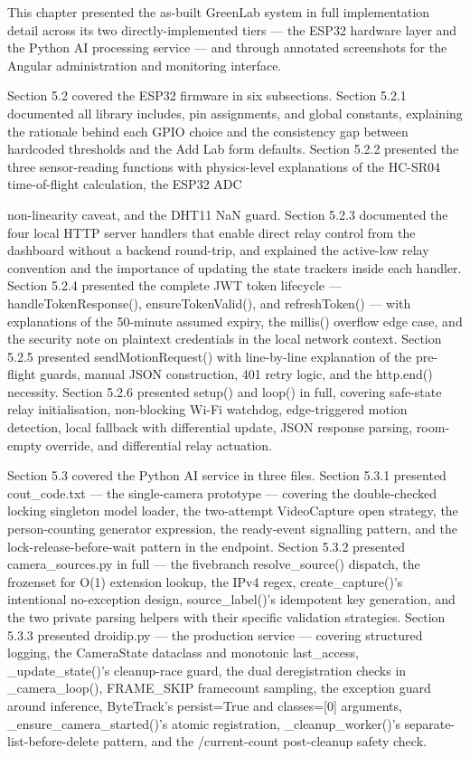 This chapter presented the as-built GreenLab system in full implementation detail across
its two directly-implemented tiers --- the ESP32 hardware layer and the Python AI processing service --- and through annotated screenshots for the Angular administration and
monitoring interface.

Section 5.2 covered the ESP32 ﬁrmware in six subsections. Section 5.2.1 documented
all library includes, pin assignments, and global constants, explaining the rationale behind each GPIO choice and the consistency gap between hardcoded thresholds and the
Add Lab form defaults. Section 5.2.2 presented the three sensor-reading functions with
physics-level explanations of the HC-SR04 time-of-ﬂight calculation, the ESP32 ADC



non-linearity caveat, and the DHT11 NaN guard. Section 5.2.3 documented the four local
HTTP server handlers that enable direct relay control from the dashboard without a backend
round-trip, and explained the active-low relay convention and the importance of updating
the state trackers inside each handler. Section 5.2.4 presented the complete JWT token
lifecycle --- handleTokenResponse(), ensureTokenValid(), and refreshToken() ---
with explanations of the 50-minute assumed expiry, the millis() overﬂow edge case,
and the security note on plaintext credentials in the local network context. Section 5.2.5
presented sendMotionRequest() with line-by-line explanation of the pre-ﬂight guards,
manual JSON construction, 401 retry logic, and the http.end() necessity. Section 5.2.6
presented setup() and loop() in full, covering safe-state relay initialisation, non-blocking
Wi-Fi watchdog, edge-triggered motion detection, local fallback with differential update,
JSON response parsing, room-empty override, and differential relay actuation.

Section 5.3 covered the Python AI service in three ﬁles. Section 5.3.1 presented
cout\_code.txt --- the single-camera prototype --- covering the double-checked locking
singleton model loader, the two-attempt VideoCapture open strategy, the person-counting
generator expression, the ready-event signalling pattern, and the lock-release-before-wait
pattern in the endpoint. Section 5.3.2 presented camera\_sources.py in full --- the ﬁvebranch resolve\_source() dispatch, the frozenset for O(1) extension lookup, the IPv4
regex, create\_capture()'s intentional no-exception design, source\_label()'s idempotent key generation, and the two private parsing helpers with their speciﬁc validation strategies. Section 5.3.3 presented droidip.py --- the production service --- covering structured
logging, the CameraState dataclass and monotonic last\_access, \_update\_state()'s
cleanup-race guard, the dual deregistration checks in \_camera\_loop(), FRAME\_SKIP framecount sampling, the exception guard around inference, ByteTrack's persist=True and
classes=[0] arguments, \_ensure\_camera\_started()'s atomic registration, \_cleanup\_worker()'s
separate-list-before-delete pattern, and the /current-count post-cleanup safety check.

